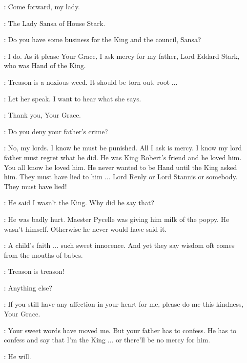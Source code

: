 \JOFFREY: Come forward, my lady. 


\HERALD: The Lady Sansa of House Stark. 

\CERSEI: Do you have some business for the King and the council, Sansa? 

\SANSA: I do.  As it please Your Grace, I ask mercy for my father, Lord Eddard Stark, who was Hand of the King. 

\PYCELLE: Treason is a noxious weed. It should be torn out, root $\ldots$  

\JOFFREY: Let her speak. I want to hear what she says. 

\SANSA: Thank you, Your Grace. 

\LITTLEFINGER: Do you deny your father's crime? 

\SANSA: No, my lords. I know he must be punished. All I ask is mercy. I know my lord father must regret what he did. He was King Robert's friend and he loved him. You all know he loved him. He never wanted to be Hand until the King asked him. They must have lied to him $\ldots$ Lord Renly or Lord Stannis or somebody. They must have lied! 

\JOFFREY: He said I wasn't the King. Why did he say that? 

\SANSA: He was badly hurt. Maester Pycelle was giving him milk of the poppy. He wasn't himself. Otherwise he never would have said it. 

\VARYS: A child's faith $\ldots$ such sweet innocence. And yet they say wisdom oft comes from the mouths of babes. 

\PYCELLE: Treason is treason! 

\JOFFREY: Anything else? 

\SANSA: If you still have any affection in your heart for me, please do me this kindness, Your Grace. 

\JOFFREY: Your sweet words have moved me. But your father has to confess. He has to confess and say that I'm the King $\ldots$ or there'll be no mercy for him. 

\SANSA: He will. 


